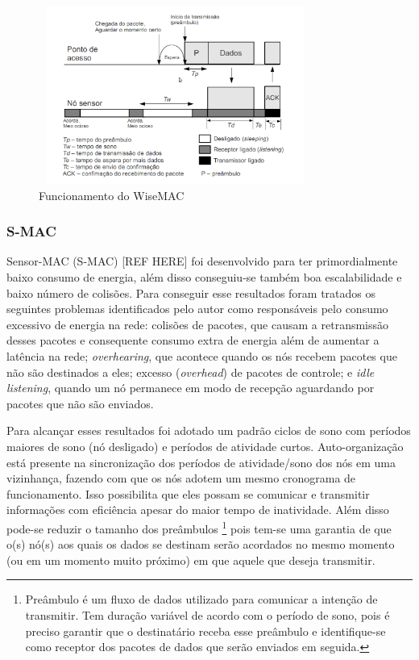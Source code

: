\begin{figure}[!htb]
\centering
\includegraphics[width=340px,height=220px]{./Pictures/wisemac.png}
\caption{Funcionamento do WiseMAC \cite{El-Hoiydi2004}} %
\label{fig:wisemac} %
\end{figure}

 \subsubsection{S-MAC}
 
 Sensor-MAC (S-MAC) [REF HERE] foi desenvolvido para ter primordialmente baixo consumo de energia, além disso conseguiu-se também boa escalabilidade e baixo número de colisões. Para conseguir esse resultados foram tratados os seguintes problemas identificados pelo autor como responsáveis pelo consumo excessivo de energia na rede: colisões de pacotes, que causam a retransmissão desses pacotes e consequente consumo extra de energia além de aumentar a latência na rede; \textit{overhearing}, que acontece quando os nós recebem pacotes que não são destinados a eles; excesso (\textit{overhead}) de pacotes de controle; e \textit{idle listening}, quando um nó permanece em modo de recepção aguardando por pacotes que não são enviados.

 Para alcançar esses resultados foi adotado um padrão ciclos de sono com períodos maiores de sono (nó desligado) e períodos de atividade curtos. Auto-organização está presente na sincronização dos períodos de atividade/sono dos nós em uma vizinhança, fazendo com que os nós adotem um mesmo cronograma de funcionamento. Isso possibilita que eles possam se comunicar e transmitir informações com eficiência apesar do maior tempo de inatividade. Além disso pode-se reduzir o tamanho dos preâmbulos%
 \footnote{Preâmbulo é um fluxo de dados utilizado para comunicar a intenção de transmitir. Tem duração variável de acordo com o período de sono, pois é preciso garantir que o destinatário receba esse preâmbulo e identifique-se como receptor dos pacotes de dados que serão enviados em seguida.}
 pois tem-se uma garantia de que o(s) nó(s) aos quais os dados se destinam serão acordados no mesmo momento (ou em um momento muito próximo) em que aquele que deseja transmitir.
 
